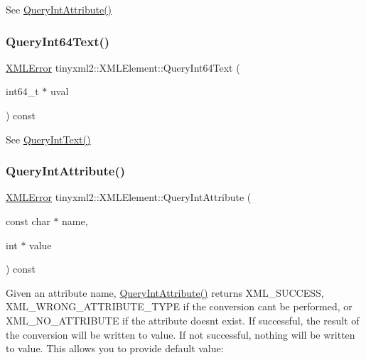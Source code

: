 See \hyperlink{classtinyxml2_1_1_x_m_l_element_a8a78bc1187c1c45ad89f2690eab567b1}{Query\+Int\+Attribute()} 

\mbox{\label{classtinyxml2_1_1_x_m_l_element_a120c538c8eead169e635dbc70fb226d8}} 
\subsubsection{\texorpdfstring{Query\+Int64\+Text()}{QueryInt64Text()}}
{\footnotesize\ttfamily \hyperlink{namespacetinyxml2_a1fbf88509c3ac88c09117b1947414e08}{X\+M\+L\+Error} tinyxml2\+::\+X\+M\+L\+Element\+::\+Query\+Int64\+Text (\begin{DoxyParamCaption}\item[{int64\+\_\+t $\ast$}]{uval }\end{DoxyParamCaption}) const}



See \hyperlink{classtinyxml2_1_1_x_m_l_element_a926357996bef633cb736e1a558419632}{Query\+Int\+Text()} 

\mbox{\label{classtinyxml2_1_1_x_m_l_element_a8a78bc1187c1c45ad89f2690eab567b1}} 
\subsubsection{\texorpdfstring{Query\+Int\+Attribute()}{QueryIntAttribute()}}
{\footnotesize\ttfamily \hyperlink{namespacetinyxml2_a1fbf88509c3ac88c09117b1947414e08}{X\+M\+L\+Error} tinyxml2\+::\+X\+M\+L\+Element\+::\+Query\+Int\+Attribute (\begin{DoxyParamCaption}\item[{const char $\ast$}]{name,  }\item[{int $\ast$}]{value }\end{DoxyParamCaption}) const\hspace{0.3cm}{\ttfamily [inline]}}

Given an attribute name, \hyperlink{classtinyxml2_1_1_x_m_l_element_a8a78bc1187c1c45ad89f2690eab567b1}{Query\+Int\+Attribute()} returns X\+M\+L\+\_\+\+S\+U\+C\+C\+E\+SS, X\+M\+L\+\_\+\+W\+R\+O\+N\+G\+\_\+\+A\+T\+T\+R\+I\+B\+U\+T\+E\+\_\+\+T\+Y\+PE if the conversion can\textquotesingle{}t be performed, or X\+M\+L\+\_\+\+N\+O\+\_\+\+A\+T\+T\+R\+I\+B\+U\+TE if the attribute doesn\textquotesingle{}t exist. If successful, the result of the conversion will be written to \textquotesingle{}value\textquotesingle{}. If not successful, nothing will be written to \textquotesingle{}value\textquotesingle{}. This allows you to provide default value\+:

